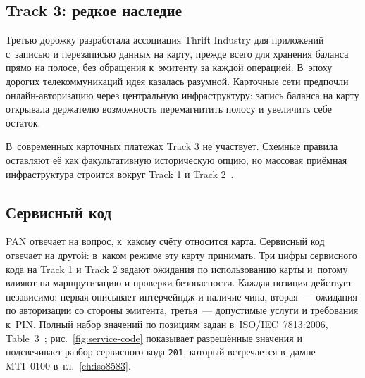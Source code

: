 \subsection*{Track 3: редкое наследие}

Третью дорожку разработала ассоциация Thrift Industry для приложений
с~записью и перезаписью данных на карту, прежде всего для хранения
баланса прямо на полосе, без обращения к~эмитенту за каждой
операцией. В~эпоху дорогих телекоммуникаций идея казалась разумной.
Карточные сети предпочли онлайн-авторизацию через центральную
инфраструктуру: запись баланса на карту открывала держателю
возможность перемагнитить полосу и увеличить себе остаток.

В~современных карточных платежах Track 3 не участвует. Схемные
правила оставляют её как факультативную историческую опцию,
но массовая приёмная инфраструктура строится вокруг Track 1
и Track 2~\cite{iso-7813,mc-security-rules-2016}.

\subsection*{Сервисный код}

PAN отвечает на вопрос, к~какому счёту относится карта. Сервисный
код отвечает на другой: в~каком режиме эту карту принимать.
Три цифры сервисного кода на Track 1 и Track 2 задают ожидания
по использованию карты и~потому влияют на маршрутизацию и проверки
безопасности. Каждая позиция действует независимо: первая описывает интерчейндж и наличие чипа, вторая~--- ожидания по авторизации со стороны эмитента, третья~--- допустимые услуги и требования к~PIN. Полный набор значений по позициям задан в~ISO/IEC~7813:2006, Table~3~\cite{iso-7813}; рис.~\ref{fig:service-code} показывает разрешённые значения и подсвечивает разбор сервисного кода \texttt{201}, который встречается в~дампе MTI~0100 в~гл.~\ref{ch:iso8583}.

